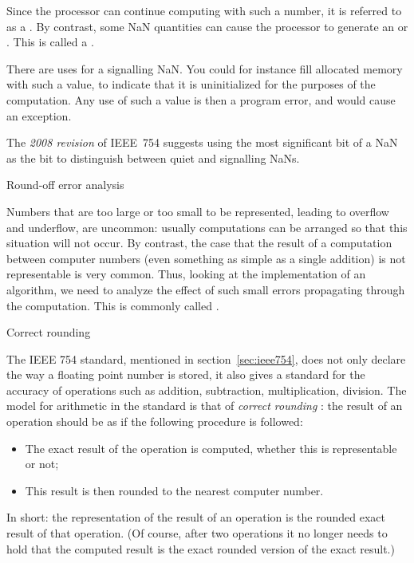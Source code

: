 Since the processor can continue computing with such a number, it is
referred to as a . By contrast, some NaN
quantities can cause the processor to generate an
 or . This is called a
. 

There are uses for a signalling NaN. You could for instance fill
allocated memory with such a value, to indicate that it is
uninitialized for the purposes of the computation. Any use of such a
value is then a program error, and would cause an exception.

The \emph{2008 revision}%
 of IEEE~754 suggests using the most
significant bit of a NaN as the  bit to distinguish
between quiet and signalling NaNs.


 {Round-off error analysis}

Numbers that are too large or too small to be represented, leading to
overflow and underflow, are
uncommon: usually computations can be arranged so that this situation
will not occur. By contrast, the case that the result of a computation
between computer numbers
(even something as simple as a single addition) 
is not representable is very common. Thus, looking at the
implementation of an algorithm, we need to analyze the
effect of such small errors propagating through the computation.
This is commonly called
.

 {Correct rounding}

The IEEE 754 standard, mentioned in section~\ref{sec:ieee754}, does
not only declare the way a floating point number is stored, it also
gives a standard for the accuracy of operations such as addition,
subtraction, multiplication, division. The model for arithmetic in the
standard is that of \emph{correct rounding}%
%
%
:
the result of an
operation should be as if the following procedure is followed:
\begin{itemize}
\item The exact result of the operation is computed, whether this is
  representable or not;
\item This result is then rounded to the nearest computer number.
\end{itemize}
In short: the representation of the result of an
operation is the rounded exact result of that operation. (Of course,
after two operations it no longer needs to hold that the computed
result is the exact rounded version of the exact result.)

